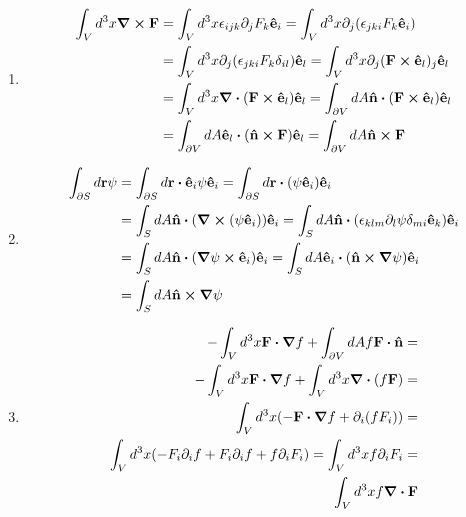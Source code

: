 \documentclass{article}
\begin{document}
\begin{enumerate}
\item \begin{align}
\begin{split}
\int_V d^3x\curl{\vb{F}}&=\int_V d^3 x \epsilon_{ijk}\partial_jF_k\vu{e}_i=\int_V d^3 x \partial_j(\epsilon_{jki}F_k\vu{e}_i)\\
&=\int_V d^3 x \partial_j(\epsilon_{jki}F_k\delta_{il})\vu{e}_l=\int_V d^3 x \partial_j(\vb{F}\cross \vu{e}_l)_j\vu{e}_l\\
&=\int_ V d^3 x \div(\vb{F}\cross \vu{e}_l)\vu{e}_l=\int_{\partial V}dA\vu{n}\vdot(\vb{F}\cross\vu{e}_l)\vu{e}_l\\
&=\int_{\partial V}dA\vu{e}_l\vdot(\vu{n}\cross\vb{F})\vu{e}_l=\int_{\partial V}dA\vu{n}\cross\vb{F}
\end{split}
\end{align}

\item \begin{align}
\begin{split}
\int_{\partial S}d\vb{r}\psi&= \int_{\partial S}d\vb{r}\vdot\vu{e}_i\psi\vu{e}_i=\int_{\partial S}d\vb{r}\vdot(\psi\vu{e}_i)\vu{e}_i\\
&=\int_S dA\vu{n}\vdot(\curl(\psi\vu{e}_i))\vu{e}_i=\int_S dA \vu{n}\vdot(\epsilon_{klm}\partial_l\psi\delta_{mi}\vu{e}_k)\vu{e}_i\\
&=\int_S dA \vu{n}\vdot(\grad{\psi}\cross\vu{e}_i)\vu{e}_i=\int_S dA \vu{e}_i\vdot(\vu{n}\cross\grad{\psi})\vu{e}_i\\
&=\int_S dA \vu{n}\cross\grad{\psi}
\end{split}
\end{align}

\item \begin{align}
\begin{split}
-\int_V d^3x\vb{F}\vdot\grad{f}+\int_{\partial V} dAf\vb{F}\vdot\vu{n}=&\\
-\int_V d^3x\vb{F}\vdot\grad{f}+\int_V d^3x\div(f\vb{F})=&\\
\int_V d^3x(-\vb{F}\vdot\grad{f}+\partial_i(fF_i))=&\\
\int_V d^3x(-F_i\partial_if+F_i\partial_i f + f\partial_i F_i)=\int_V d^3xf\partial_i F_i=&\\
\int_V d^3xf\div{\vb{F}}&
\end{split}
\end{align}

\end{enumerate}
\end{document}
